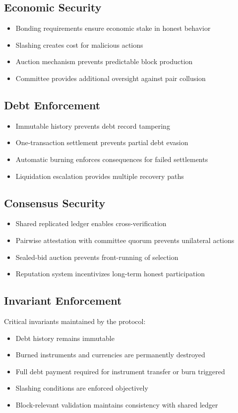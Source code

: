 \documentclass[11pt,a4paper]{article}
\begin{document}
\subsection{Economic Security}
\begin{itemize}
\item Bonding requirements ensure economic stake in honest behavior
\item Slashing creates cost for malicious actions
\item Auction mechanism prevents predictable block production
\item Committee provides additional oversight against pair collusion
\end{itemize}

\subsection{Debt Enforcement}
\begin{itemize}
\item Immutable history prevents debt record tampering
\item One-transaction settlement prevents partial debt evasion
\item Automatic burning enforces consequences for failed settlements
\item Liquidation escalation provides multiple recovery paths
\end{itemize}

\subsection{Consensus Security}
\begin{itemize}
\item Shared replicated ledger enables cross-verification
\item Pairwise attestation with committee quorum prevents unilateral actions
\item Sealed-bid auction prevents front-running of selection
\item Reputation system incentivizes long-term honest participation
\end{itemize}

\subsection{Invariant Enforcement}
Critical invariants maintained by the protocol:
\begin{itemize}
\item Debt history remains immutable
\item Burned instruments and currencies are permanently destroyed
\item Full debt payment required for instrument transfer or burn triggered
\item Slashing conditions are enforced objectively
\item Block-relevant validation maintains consistency with shared ledger
\end{itemize}
\end{document}
